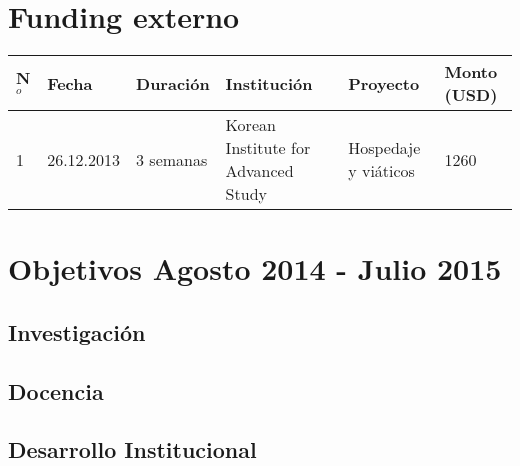 \documentclass{article}
\begin{document}
\section*{Funding externo}
\begin{tabular}{lp{1.8cm} p{2.0cm} p{3.5cm} p{2.3cm} p{2.3cm}}\hline
N$^{o}$ & Fecha & Duraci\'on & Instituci\'on & Proyecto & Monto (USD)\\\hline
1 & 26.12.2013 & 3 semanas & Korean Institute for Advanced Study & Hospedaje y vi\'aticos & 1260\\\hline
\end{tabular}

\section*{Objetivos Agosto 2014 - Julio 2015}
\subsection*{Investigaci\'on}

\subsection*{Docencia}

\subsection*{Desarrollo Institucional}
\end{document}

